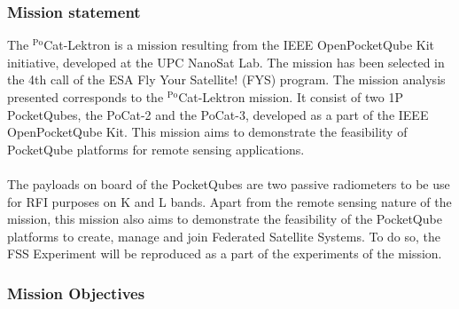 \subsubsection{Mission statement}

The $^{\text{Po}}$Cat-Lektron is a mission resulting from the IEEE OpenPocketQube Kit initiative, 
developed at the UPC NanoSat Lab. The mission has been selected in the 4th call of 
the ESA Fly Your Satellite! (FYS) program. The mission analysis presented corresponds 
to the $^{\text{Po}}$Cat-Lektron mission. It consist of two 1P PocketQubes, the PoCat-2 and the 
PoCat-3, developed as a part of the IEEE OpenPocketQube Kit. This mission aims to 
demonstrate the feasibility of PocketQube platforms for remote sensing applications.\cite{wiki}
\paragraph{}
The payloads on board of the PocketQubes are two passive radiometers to be use for 
RFI purposes on K and L bands. Apart from the remote sensing nature of the mission, 
this mission also aims to demonstrate the feasibility of the PocketQube platforms to 
create, manage and join Federated Satellite Systems. To do so, the FSS Experiment 
will be reproduced as a part of the experiments of the mission.

\subsubsection{Mission Objectives}

